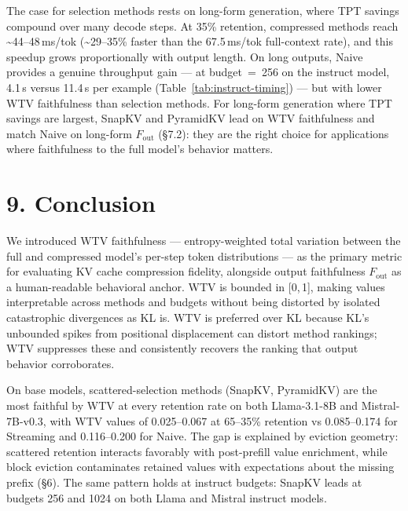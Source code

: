 \documentclass[10pt,letterpaper]{article}
\begin{document}
The case for selection methods rests on long-form generation, where TPT savings
compound over many decode steps. At 35\% retention, compressed methods reach
\textasciitilde44--48\,ms/tok (\textasciitilde29--35\% faster than the
67.5\,ms/tok full-context rate), and this speedup grows proportionally with output
length. On long outputs, Naive provides a genuine throughput gain --- at
budget~=~256 on the instruct model, 4.1\,s versus 11.4\,s per example
(Table~\ref{tab:instruct-timing}) --- but with lower WTV faithfulness than selection
methods. For long-form generation where TPT savings are largest, SnapKV and
PyramidKV lead on WTV faithfulness and match Naive on long-form \(F_{\text{out}}\)
(§7.2): they are the right choice for applications where faithfulness to the full
model's behavior matters.

\hypertarget{conclusion}{%
\section{9. Conclusion}\label{conclusion}}

We introduced WTV faithfulness --- entropy-weighted total variation between
the full and compressed model's per-step token distributions --- as the
primary metric for evaluating KV cache compression fidelity, alongside
output faithfulness \(F_{\text{out}}\) as a human-readable behavioral anchor.
WTV is bounded in [0,\,1], making values interpretable across methods and
budgets without being distorted by isolated catastrophic divergences as KL is.
WTV is preferred over KL because KL's unbounded spikes from positional
displacement can distort method rankings; WTV suppresses these and
consistently recovers the ranking that output behavior corroborates.

On base models, scattered-selection methods (SnapKV, PyramidKV) are the most
faithful by WTV at every retention rate on both Llama-3.1-8B and Mistral-7B-v0.3,
with WTV values of 0.025--0.067 at 65--35\% retention vs 0.085--0.174 for
Streaming and 0.116--0.200 for Naive. The gap is explained by eviction geometry:
scattered retention interacts favorably with post-prefill value enrichment,
while block eviction contaminates retained values with expectations about the
missing prefix (§6). The same pattern holds at instruct budgets: SnapKV leads
at budgets 256 and 1024 on both Llama and Mistral instruct models.
\end{document}
